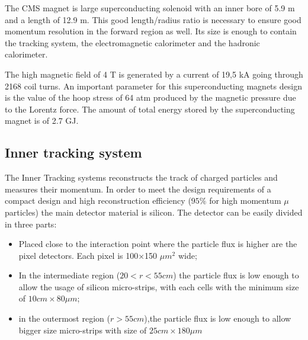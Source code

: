 The CMS magnet is large superconducting solenoid with an inner bore of 5.9 m and a length of 12.9 m.  This good length/radius ratio is necessary to ensure good momentum resolution in the forward region as well. Its size is enough to contain the tracking system, the electromagnetic calorimeter and the hadronic calorimeter. 

The high magnetic field of 4 T is generated by a current of 19,5 kA going through 2168 coil turns. An important parameter for this superconducting magnets design is the value of the hoop stress of 64 atm produced by the magnetic pressure due to the Lorentz force. The amount of total energy stored by the superconducting magnet is of 2.7 GJ.

		

\clearpage

\subsection{Inner tracking system}

The Inner Tracking systems reconstructs the track of charged particles and measures their momentum. In order to meet the design requirements of a compact design and high reconstruction efficiency ($95\%$ for high momentum $\mu$ particles) the main detector material is silicon.
The detector can be easily divided in three parts:
\begin{itemize}
	\item Placed close to the interaction point where the particle flux is higher are the pixel detectors. Each pixel is 100×150 $\mu m^{2}$ wide;
	\item In the intermediate region ($20 < r < 55 cm$) the particle flux is low enough to allow the usage of silicon micro-strips, with each cells with the minimum size of $10 cm × 80 \mu m$;
	\item in the outermost region ($r > 55 cm$),the particle flux is low enough to allow bigger size micro-strips with size of $25 cm × 180 \mu m$ 
\end{itemize}

